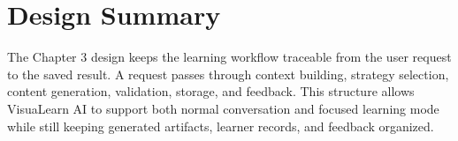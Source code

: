 \section{Design Summary}

The Chapter 3 design keeps the learning workflow traceable from the user request to the saved result. A request passes through context building, strategy selection, content generation, validation, storage, and feedback. This structure allows VisuaLearn AI to support both normal conversation and focused learning mode while still keeping generated artifacts, learner records, and feedback organized.
